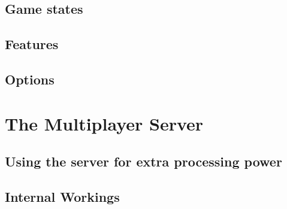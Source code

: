 \documentclass[11pt]{report}
\begin{document}
\section{Game states}

\section{Features}

\section{Options}

\chapter{The Multiplayer Server}

\section{Using the server for extra processing power}

\section{Internal Workings}
\end{document}
